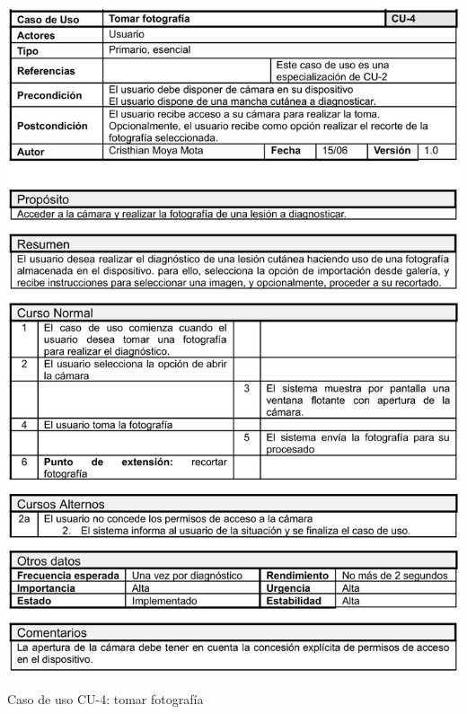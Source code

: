   \begin{table}[H]
	\centering
	\includegraphics[scale=0.85]{imagenes/cu-4.png}
	\caption{Caso de uso CU-4: tomar fotografía}
	\label{fig:cu4}
\end{table}

